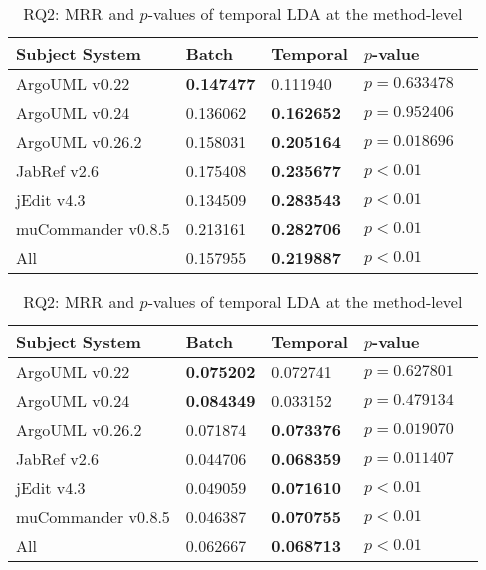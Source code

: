 \begin{table}[t]
\renewcommand{\arraystretch}{1.3}
\footnotesize
\centering
\caption{RQ2: MRR and $p$-values of temporal LDA at the class-level}
\begin{tabular}{l|ll|ll}
\toprule
Subject System & Batch & Temporal & $p$-value  \\
\midrule
ArgoUML v0.22 & {\bf 0.147477 } & 0.111940 & $p = 0.633478$ \\
ArgoUML v0.24 & 0.136062 & {\bf 0.162652 } & $p = 0.952406$ \\
ArgoUML v0.26.2 & 0.158031 & {\bf 0.205164 } & $p = 0.018696$ \\
JabRef v2.6 & 0.175408 & {\bf 0.235677 } & $p < 0.01$ \\
jEdit v4.3 & 0.134509 & {\bf 0.283543 } & $p < 0.01$ \\
muCommander v0.8.5 & 0.213161 & {\bf 0.282706 } & $p < 0.01$ \\
\midrule
All & 0.157955 & {\bf 0.219887 } & $p < 0.01$ \\
\bottomrule
\end{tabular}
\label{table:rq2:class:lda}
\caption{RQ2: MRR and $p$-values of temporal LDA at the method-level}
\begin{tabular}{l|ll|ll}
\toprule
Subject System & Batch & Temporal & $p$-value  \\
\midrule
ArgoUML v0.22 & {\bf 0.075202 } & 0.072741 & $p = 0.627801$ \\
ArgoUML v0.24 & {\bf 0.084349 } & 0.033152 & $p = 0.479134$ \\
ArgoUML v0.26.2 & 0.071874 & {\bf 0.073376 } & $p = 0.019070$ \\
JabRef v2.6 & 0.044706 & {\bf 0.068359 } & $p = 0.011407$ \\
jEdit v4.3 & 0.049059 & {\bf 0.071610 } & $p < 0.01$ \\
muCommander v0.8.5 & 0.046387 & {\bf 0.070755 } & $p < 0.01$ \\
\midrule
All & 0.062667 & {\bf 0.068713 } & $p < 0.01$ \\
\bottomrule
\end{tabular}
\label{table:rq2:method:lda}
\end{table}
